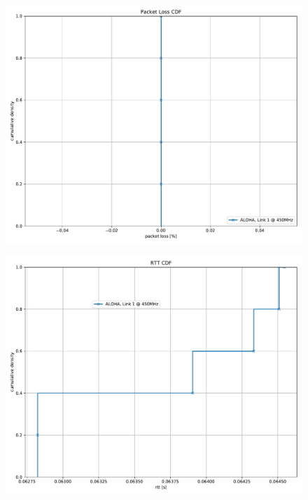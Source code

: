 \documentclass{article}
\begin{document}
\begin{figure}
	\includegraphics[width=\textwidth]{aloha_rb_high/cdf/packet_loss_cdf}
\end{figure}

\begin{figure}
	\includegraphics[width=\textwidth]{aloha_rb_high/cdf/rtt_cdf}
\end{figure}
\end{document}
